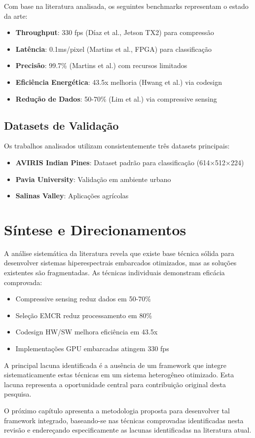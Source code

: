 Com base na literatura analisada, os seguintes benchmarks representam o estado da arte:

\begin{itemize}
\item \textbf{Throughput}: 330 fps (Díaz et al., Jetson TX2) para compressão
\item \textbf{Latência}: 0.1ms/pixel (Martins et al., FPGA) para classificação
\item \textbf{Precisão}: 99.7\% (Martins et al.) com recursos limitados
\item \textbf{Eficiência Energética}: 43.5x melhoria (Hwang et al.) via codesign
\item \textbf{Redução de Dados}: 50-70\% (Lim et al.) via compressive sensing
\end{itemize}

\subsection{Datasets de Validação}

Os trabalhos analisados utilizam consistentemente três datasets principais:

\begin{itemize}
\item \textbf{AVIRIS Indian Pines}: Dataset padrão para classificação (614×512×224)
\item \textbf{Pavia University}: Validação em ambiente urbano
\item \textbf{Salinas Valley}: Aplicações agrícolas
\end{itemize}

\section{Síntese e Direcionamentos}

A análise sistemática da literatura revela que existe base técnica sólida para desenvolver sistemas hiperespectrais embarcados otimizados, mas as soluções existentes são fragmentadas. As técnicas individuais demonstram eficácia comprovada:

\begin{itemize}
\item Compressive sensing reduz dados em 50-70\% \cite{lim2022}
\item Seleção EMCR reduz processamento em 80\% \cite{martins2019}
\item Codesign HW/SW melhora eficiência em 43.5x \cite{hwang2011}
\item Implementações GPU embarcadas atingem 330 fps \cite{diaz2019}
\end{itemize}

A principal lacuna identificada é a ausência de um framework que integre sistematicamente estas técnicas em um sistema heterogêneo otimizado. Esta lacuna representa a oportunidade central para contribuição original desta pesquisa.

O próximo capítulo apresenta a metodologia proposta para desenvolver tal framework integrado, baseando-se nas técnicas comprovadas identificadas nesta revisão e endereçando especificamente as lacunas identificadas na literatura atual.